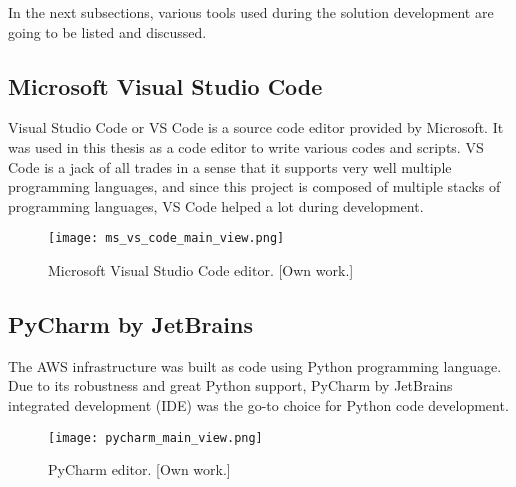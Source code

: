 In the next subsections, various tools used during the solution development are going to be listed and discussed.



\subsection{Microsoft Visual Studio Code}
\label{subsec:ms-visual-studio-code}

Visual Studio Code or VS Code is a source code editor provided by Microsoft. It was used in this thesis as a code editor to write various codes and scripts. VS Code is a jack of all trades in a sense that it supports very well multiple programming languages, and since this project is composed of multiple stacks of programming languages, VS Code helped a lot during development.

\begin{figure}[H]
    \centering \texttt{[image: ms\_vs\_code\_main\_view.png]}
    \caption{Microsoft Visual Studio Code editor. [Own work.]}
    \label{fig:ms-vs-code}
\end{figure}




\subsection{PyCharm by JetBrains}
\label{subsec:pycharm}

The AWS infrastructure was built as code using Python programming language. Due to its robustness and great Python support, PyCharm by JetBrains integrated development (IDE) was the go-to choice for Python code development.

\begin{figure}[H]
    \centering \texttt{[image: pycharm\_main\_view.png]}
    \caption{PyCharm editor. [Own work.]}
    \label{fig:pycharm}
\end{figure}



